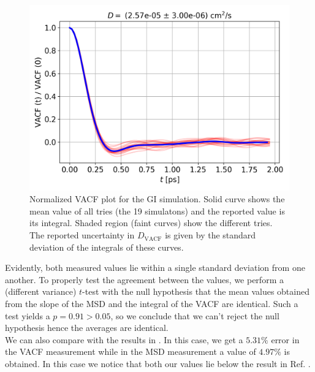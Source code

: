 \documentclass[%
aps,
pra,%
amsmath,amssymb,
preprint,%
reprint,%
notitlepage,
a4paper]{revtex4-1}
\begin{document}
\begin{figure}
	\centering
	\includegraphics[width=0.99\linewidth]{../task2/results/vacfvst}
	\caption{Normalized VACF plot for the GI simulation. Solid curve shows the mean value of all tries (the 19 simulatons) and the reported value is its integral. Shaded region (faint curves) show the different tries. The reported uncertainty in $D_\mathrm{VACF}$ is given by the standard deviation of the integrals of these curves.}
	\label{fig:vacfvst}
\end{figure}
Evidently, both measured values lie within a single standard deviation from one another. To properly test the agreement between the values, we perform a (different variance) $t$-test with the null hypothesis that the mean values obtained from the slope of the MSD and the integral of the VACF are identical. Such a test yields a $p=0.91 > 0.05$, so we conclude that we can't reject the null hypothesis hence the averages are identical.\\
We can also compare with the results in \citep{Rahman1964}. In this case, we get a $5.31\%$ error in the VACF measurement while in the MSD measurement a value of $4.97\%$ is obtained. In this case we notice that both our values lie below the result in Ref. \cite{Rahman1964}.
\end{document}
